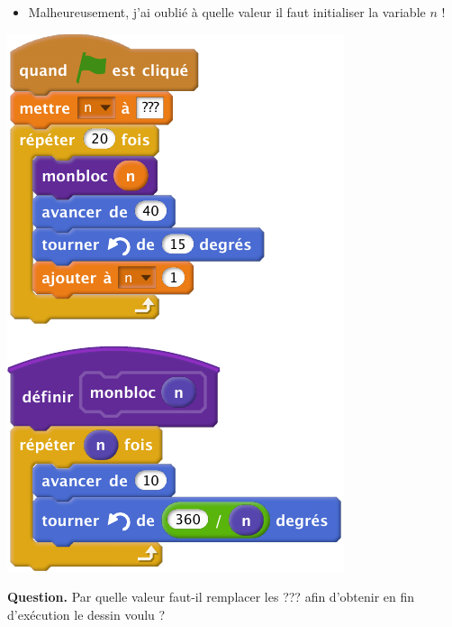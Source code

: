 \documentclass[class=report,crop=false, 12pt]{standalone}
\begin{document}
\begin{enigme}
\begin{minipage}{0.49\textwidth}
\begin{itemize}
  \item Malheureusement, j'ai oublié à quelle valeur il faut initialiser la variable $n$ !
\end{itemize} 
\end{minipage}
\begin{minipage}{0.49\textwidth}
\begin{center}
  \includegraphics[scale=\scalebloc,scale=0.8]{code-11-eg2} 
\end{center} 
\end{minipage}


\bigskip

\textbf{Question.} Par quelle valeur faut-il remplacer les \og{}???\fg{} afin d'obtenir en fin d'exécution le dessin voulu ?


\end{enigme}
\end{document}
